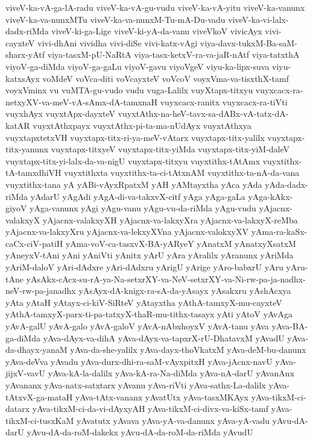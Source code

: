 {viveV-ka-vA-ga-lA-radu
viveV-ka-vA-gu-vudu
viveV-ka-vA-yitu
viveV-ka-vanunx
viveV-ka-va-nunxMTu
viveV-ka-va-nunxM-Tu-mA-Du-vadu
viveV-ka-vi-lalx-dadx-riMda
viveV-ki-ga-Lige
viveV-ki-yA-da-vanu
viveVkoV
vivicAyx
vivi-cayxteV
vivi-dhAni
vividha
vivi-diSe
vivi-katx-vAgi
viya-davx-tukxM-Ba-saM-sharx-yAtf
viya-tasxM-pU-NaRtA
viya-tasx-ketxV-ra-va-jaR-nAtf
viya-tatxthA
viyoV-ga-diMda
viyoV-ga-gaLu
viyoV-gavu
viyoVgeV
viyu-ka-lipx-suva
viyu-katxsAyx
voMdeV
voVca-diti
voVcayxteV
voVcoV
voyxVma-va-tisxthX-tamf
voyxVminx
vu
vuMTA-gu-vudo
vudu
vuga-Lalilx
vuyXtapx-titxyu
vuyxcacx-ra-netxyXV-va-meV-vA-sAmx-dA-tamxnaH
vuyxcacx-ranitx
vuyxcacx-ra-tiVti
vuyxhAyx
vuyxtApx-dayxteV
vuyxtAthx-na-heV-tavx-sa-dABx-vA-tatx-dA-katAR
vuyxtAthxpayx
vuyxtAthx-pi-ta-ma-nUdAyx
vuyxtAthxya
vuyxtapxtetxVH
vuyxtapx-titx-ri-ya-meV-vAtarx
vuyxtapx-titx-yalilx
vuyxtapx-titx-yanunx
vuyxtapx-titxyeV
vuyxtapx-titx-yiMda
vuyxtapx-titx-yiM-daleV
vuyxtapx-titx-yi-lalx-da-va-nigU
vuyxtapx-titxyu
vuyxtithx-tAtAmx
vuyxtithx-tA-tamxdhiVH
vuyxtithxta
vuyxtithx-ta-ci-tAtxnAM
vuyxtithx-ta-nA-da-vana
vuyxtithx-tana
yA
yABi-vAyxRpatxM
yAH
yAMtayxtha
yAca
yAda
yAda-dadx-riMda
yAdarU
yAgAdi
yAgA-di-va-takxvX-citf
yAga
yAga-gaLa
yAga-kAkx-giyoV
yAga-vanunx
yAgi
yAgu-vanu
yAgu-vu-da-riMda
yAgu-vudu
yAjacnx-valakxyX
yAjacnx-valakxyXH
yAjacnx-va-lakxyXra
yAjacnx-va-lakxyX-reMba
yAjacnx-va-lakxyXru
yAjacnx-va-lekxyXVna
yAjacnx-valokxyXV
yAma-ra-kaSx-caCx-ciV-patiH
yAma-voV-ca-tasxvX-BA-yARyeY
yAnatxM
yAnatxyXsatxM
yAneyxV-tAni
yAni
yAniVti
yAnitx
yArU
yAra
yAralilx
yAranunx
yAriMda
yAriM-daloV
yAri-dAdxre
yAri-dAdxru
yArigU
yArige
yAro-babxrU
yAru
yAru-tAne
yAsAkx-cAcx-su-rA-ya-Na-setxrXY-va-NeV-setxrXY-va-Ni-rw-pa-ja-nadhx-neV-rw-pa-janadhx
yAsAyx-dA-knigx-ra-sA-da-yAsayx
yAsakxru
yAshAcxya
yAta
yAtaH
yAtayx-ci-kiV-SiRteV
yAtayxtha
yAthA-tamxyX-mu-cayxteV
yAthA-tamxyX-parx-ti-pa-tatxyX-thaR-mu-tithx-tasayx
yAti
yAtoV
yAvAga
yAvA-galU
yAvA-galo
yAvA-galoV
yAvA-nAbxhoyxV
yAvA-tanu
yAva
yAva-BA-ga-diMda
yAva-dAyx-va-dihA
yAva-dAyx-va-tapxrX-rU-DhatavxM
yAvadU
yAva-da-dhayx-yanaM
yAva-da-she-yalilx
yAva-dayx-thoVkatxM
yAva-deM-bu-danunx
yAva-deVva
yAvadu
yAva-durx-dhi-ra-saM-vAyxpitxH
yAva-jAcnx-navU
yAva-jijxV-vavU
yAva-kA-la-dalilx
yAva-kA-ra-Na-diMda
yAva-nA-darU
yAvanAnx
yAvananx
yAva-natx-satxtarx
yAvanu
yAva-riVti
yAva-sathx-La-dalilx
yAva-tAtxvX-ga-mataH
yAva-tAtx-vananx
yAvatUtx
yAva-tasxMKAyx
yAva-tikxM-ci-datarx
yAva-tikxM-ci-da-vi-dAyxyAH
yAva-tikxM-ci-divx-va-kiSx-tamf
yAva-tikxM-ci-tusxKaM
yAvatutx
yAvava
yAva-yA-va-danunx
yAva-yA-vadu
yAvu-dA-darU
yAvu-dA-da-roM-dakekx
yAvu-dA-da-roM-da-riMda
yAvudU
}
